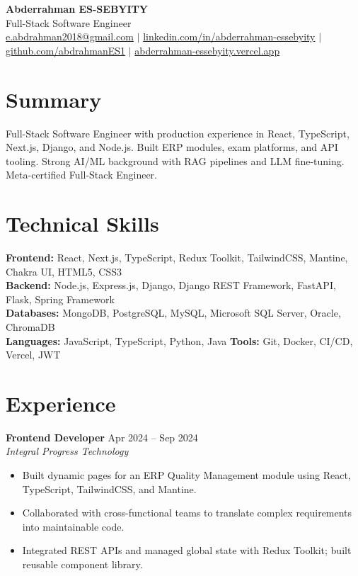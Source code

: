 \documentclass[11pt,a4paper]{article}
\begin{document}
\begin{center}
  {\Large\bfseries Abderrahman ES-SEBYITY} \\[3pt]
  {\normalsize Full-Stack Software Engineer} \\[3pt]
  {\small
  \href{mailto:e.abdrahman2018@gmail.com}{e.abdrahman2018@gmail.com} $\vert$
  \href{https://linkedin.com/in/abderrahman-essebyity}{linkedin.com/in/abderrahman-essebyity} $\vert$
  \href{https://github.com/abdrahmanES1}{github.com/abdrahmanES1} $\vert$
  \href{https://abderrahman-essebyity.vercel.app}{abderrahman-essebyity.vercel.app}}
\end{center}

\section{Summary}
{\small Full-Stack Software Engineer with production experience in React, TypeScript, Next.js, Django, and Node.js. Built ERP modules, exam platforms, and API tooling. Strong AI/ML background with RAG pipelines and LLM fine-tuning. Meta-certified Full-Stack Engineer.}

\section{Technical Skills}
{\small
\textbf{Frontend:} React, Next.js, TypeScript, Redux Toolkit, TailwindCSS, Mantine, Chakra UI, HTML5, CSS3 \\
\textbf{Backend:} Node.js, Express.js, Django, Django REST Framework, FastAPI, Flask, Spring Framework \\
\textbf{Databases:} MongoDB, PostgreSQL, MySQL, Microsoft SQL Server, Oracle, ChromaDB \\
\textbf{Languages:} JavaScript, TypeScript, Python, Java \quad
\textbf{Tools:} Git, Docker, CI/CD, Vercel, JWT}

\section{Experience}

{\small
\textbf{Frontend Developer} \hfill Apr 2024 -- Sep 2024 \\
\textit{Integral Progress Technology}}
\begin{itemize}[leftmargin=12pt]
  \item {\small Built dynamic pages for an ERP Quality Management module using React, TypeScript, TailwindCSS, and Mantine.}
  \item {\small Collaborated with cross-functional teams to translate complex requirements into maintainable code.}
  \item {\small Integrated REST APIs and managed global state with Redux Toolkit; built reusable component library.}
\end{itemize}
\end{document}
